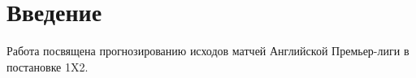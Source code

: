 \section{Введение}
Работа посвящена прогнозированию исходов матчей Английской Премьер-лиги в постановке 1X2.
